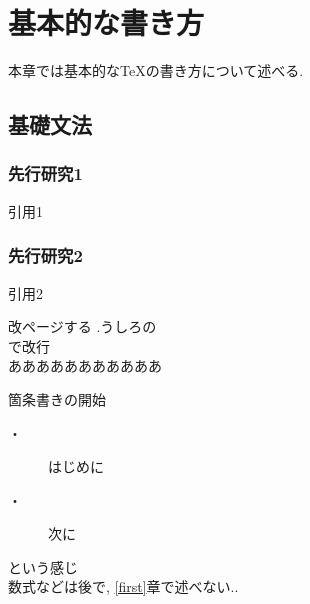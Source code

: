 \chapter{基本的な書き方 \label{first}}
本章では基本的なTeXの書き方について述べる. 

\section{基礎文法}

\subsection{先行研究1}
引用1\cite{citrfirst}
\subsection{先行研究2}
引用2\cite{citesecond}

改ページする
\newpage
.うしろの{\\}で改行\\
あああああああああああ

箇条書きの開始
\begin{description}
\item [・]はじめに 
\item [・]次に
\end{description}
という感じ\\
数式などは後で, \ref{first}章で述べない.. 
